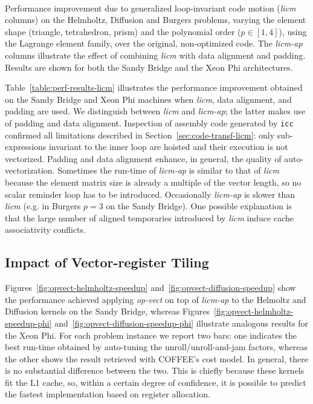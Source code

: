 \documentclass[conference]{IEEEtran}
\begin{document}
\begin{table}[t]\footnotesize
\massmatrixtwodresultsnorms
~
\caption{Performance improvement due to generalized loop-invariant code motion (\emph{licm} columns) on the Helmholtz, Diffusion and Burgers problems, varying the element shape (triangle, tetrahedron, prism) and the polynomial order ($p \in [1, 4]$), using the Lagrange element family, over the original, non-optimized code. The \emph{licm-ap} columns illustrate the effect of combining \emph{licm} with data alignment and padding. Results are shown for both the Sandy Bridge and the Xeon Phi architectures.}
\label{table:perf-results-licm}
\end{table}

Table~\ref{table:perf-results-licm} illustrates the performance improvement obtained on the Sandy Bridge and Xeon Phi machines when \emph{licm}, data alignment, and padding are used. We distinguish between \emph{licm} and \emph{licm-ap}; the latter makes use of padding and data alignment. Inspection of assembly code generated by \texttt{icc} confirmed all limitations described in Section~\ref{sec:code-transf-licm}: only sub-expressions invariant to the inner loop are hoisted and their execution is not vectorized. Padding and data alignment enhance, in general, the quality of auto-vectorization. Sometimes the run-time of \emph{licm-ap} is similar to that of \emph{licm} because the element matrix size is already a multiple of the vector length, so no scalar reminder loop has to be introduced. Occasionally \emph{licm-ap} is slower than \emph{licm} (e.g. in Burgers $p=3$ on the Sandy Bridge). One possible explanation is that the large number of aligned temporaries introduced by \emph{licm} induce cache associativity conflicts.

\subsection{Impact of Vector-register Tiling}
\label{sec:perf-eval-opvect}
Figures~\ref{fig:opvect-helmholtz-speedup} and~\ref{fig:opvect-diffusion-speedup} show the performance achieved applying \emph{op-vect} on top of \emph{licm-ap} to the Helmoltz and Diffusion kernels on the Sandy Bridge, whereas Figures~\ref{fig:opvect-helmholtz-speedup-phi} and~\ref{fig:opvect-diffusion-speedup-phi} illustrate analogous results for the Xeon Phi. For each problem instance we report two bars: one indicates the best run-time obtained by auto-tuning the unroll/unroll-and-jam factors, whereas the other shows the result retrieved with COFFEE's cost model. In general, there is no substantial difference between the two. This is chiefly because these kernels fit the L1 cache, so, within a certain degree of confidence, it is possible to predict the fastest implementation based on register allocation.
\end{document}
